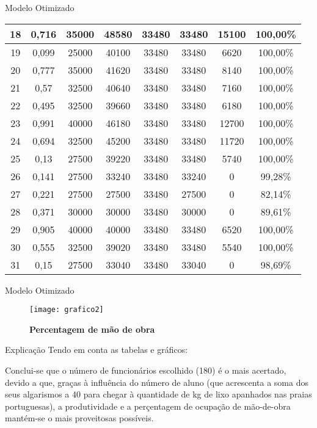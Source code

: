 \documentclass [11pt, a4paper]{beamer}
\begin{document}
\begin{frame}{Modelo Otimizado}
\begin{table} [h]
\begin{center}
\begin{adjustbox}{max width=\textwidth,max totalheight=\textheight,keepaspectratio}
\begin{tabular} {|c|c|c|c|c|c|c|c|}
18 &	0,716 &	35000 &	48580 &	33480 &	33480 &	15100 &	100,00\%\\ \hline
19 &	0,099 &	25000 &	40100 &	33480 &	33480 &	6620 &	100,00\%\\ \hline
20 &	0,777 &	35000 &	41620 &	33480 &	33480 &	8140 &	100,00\%\\ \hline
21 &	0,57 &	32500 &	40640 &	33480 &	33480 &	7160 &	100,00\%\\ \hline
22 &	0,495 &	32500 &	39660 &	33480 &	33480 &	6180 &	100,00\%\\ \hline
23 &	0,991 &	40000 &	46180 &	33480 &	33480 &	12700 &	100,00\%\\ \hline
24 &	0,694 &	32500 &	45200 &	33480 &	33480 &	11720 &	100,00\%\\ \hline
25 &	0,13 &	27500 &	39220 &	33480 &	33480 &	5740 &	100,00\%\\ \hline
26 &	0,141 &	27500 &	33240 &	33480 &	33240 &	0 &	99,28\%\\ \hline
27 &	0,221 &	27500 &	27500 &	33480 &	27500 &	0 &	82,14\%\\ \hline
28 &	0,371 &	30000 &	30000 &	33480 &	30000 &	0 &	89,61\%\\ \hline
29 &	0,905 &	40000 &	40000 &	33480 &	33480 &	6520 &	100,00\%\\ \hline
30 &	0,555 &	32500 &	39020 &	33480 &	33480 &	5540 &	100,00\%\\ \hline
31 &	0,15 &	27500 &	33040 &	33480 &	33040 &	0 &	98,69\%\\
\hline 
\end{tabular}
\end{adjustbox}
\end{center}
\end{table}
\end{frame}
\begin{frame}{Modelo Otimizado}
\begin{figure} [h]
\begin{center}
\caption{\bf Percentagem de mão de obra}
\texttt{[image: grafico2]}
\end{center}
\end{figure}
\end{frame}
\begin{frame}{Explicação}
Tendo em conta as tabelas e gráficos: \par
Conclui-se que o número de funcionários escolhido (180) é o mais acertado, devido a que, graças à influência do número de aluno (que acrescenta a soma dos seus algarismos a 40 para chegar à quantidade de kg de lixo apanhados nas praias portuguesas), a produtividade e a perçentagem de ocupação de mão-de-obra mantém-se o mais proveitosas possíveis. 
\end{frame}
\end{document}
